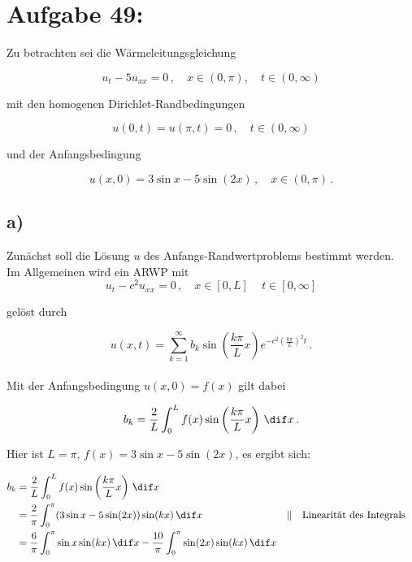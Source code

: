 \section{Aufgabe 49:}

Zu betrachten sei die Wärmeleitungsgleichung 

\begin{equation*}
    u_t - 5 u_{xx} = 0 \,, \quad x \in (0,\pi), \quad t \in (0,\infty)
\end{equation*}

mit den homogenen Dirichlet-Randbedingungen

\begin{equation*}
    u(0,t) = u(\pi,t) = 0 \,, \quad t \in (0,\infty)
\end{equation*}

und der Anfangsbedingung 

\begin{equation*}
    u(x,0) = 3 \sin x - 5 \sin (2x) \,, \quad x \in (0,\pi) \,.
\end{equation*}

\subsection{a)}

Zunächst soll die Lösung $u$ des Anfangs-Randwertproblems bestimmt werden. \\

Im Allgemeinen wird ein ARWP mit
\begin{equation*}
    u_t - c^2 u_{xx} = 0 \,, \quad x \in [0,L] \, \quad t \in [0,\infty]
\end{equation*} 

gelöst durch 

\begin{equation*}
    u(x,t) = \sum_{k=1}^\infty b_k \sin\left(\frac{k \pi}{L} x \right) e^{-c^2 \left(\frac{k\pi}{L}\right)^2 t} \,.
\end{equation*} \\

Mit der Anfangsbedingung $u(x,0) = f(x)$ gilt dabei

\begin{equation*}
    b_k = \frac{2}{L} \int_0^L f(x) \sin \left(\frac{k \pi}{L}x \right) \,\dif x \,.
\end{equation*}

Hier ist $L = \pi$, $f(x) = 3 \sin x - 5 \sin (2x)$, es ergibt sich:

\begin{align*}
    b_k &= \frac{2}{L}   \int_0^L f(x) \sin \left(\frac{k \pi}{L}x \right) \,\dif x \\
        &= \frac{2}{\pi} \int_0^\pi (3 \sin x - 5 \sin (2x)) \sin (kx) \,\dif x  && || \quad \text{Linearität des Integrals} \\
        &= \frac{6}{\pi} \int_0^\pi \sin x \sin (kx) \,\dif x - \frac{10}{\pi} \int_0^\pi \sin (2x) \sin (kx) \,\dif x
\end{align*}

